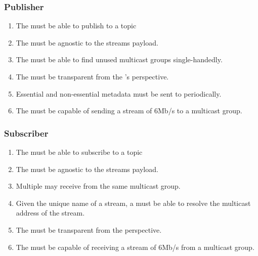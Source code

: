 \subsubsection*{Publisher}
\begin{enumerate}
	\item The \pubs{} must be able to publish to a topic
	\item The \pub{} must be agnostic to the streams payload.
	\item The  must be able to find unused multicast groups single-handedly.
	\item The \pub must be transparent from the \pro's perspective.
	\item Essential and non-essential metadata must be sent to  periodically.
	\item The \pub{} must be capable of sending a stream of 6Mb/s to a multicast group.
\end{enumerate}

\subsubsection*{Subscriber}
\begin{enumerate}
	\item The \subs{} must be able to subscribe to a topic
	\item The \sub{} must be agnostic to the streams payload.
	\item Multiple \subs{} may receive from the same multicast group.
	\item Given the unique name of a stream, a  must be able to resolve the multicast address of the stream.
	\item The \sub{} must be transparent from the \con{} perspective.
	\item The \sub{} must be capable of receiving a stream of 6Mb/s from a multicast group.
\end{enumerate}

